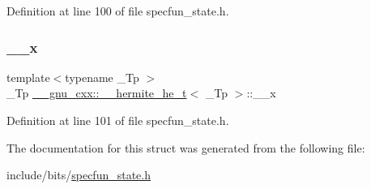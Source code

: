 Definition at line 100 of file specfun\+\_\+state.\+h.

\mbox{\label{struct____gnu__cxx_1_1____hermite__he__t_a24b66f5153ce3e231976e18b4eccb2a0}} 
\subsubsection{\texorpdfstring{\+\_\+\+\_\+x}{\_\_x}}
{\footnotesize\ttfamily template$<$typename \+\_\+\+Tp $>$ \\
\+\_\+\+Tp \hyperlink{struct____gnu__cxx_1_1____hermite__he__t}{\+\_\+\+\_\+gnu\+\_\+cxx\+::\+\_\+\+\_\+hermite\+\_\+he\+\_\+t}$<$ \+\_\+\+Tp $>$\+::\+\_\+\+\_\+x}



Definition at line 101 of file specfun\+\_\+state.\+h.



The documentation for this struct was generated from the following file\+:\begin{DoxyCompactItemize}
\item 
include/bits/\hyperlink{specfun__state_8h}{specfun\+\_\+state.\+h}\end{DoxyCompactItemize}
